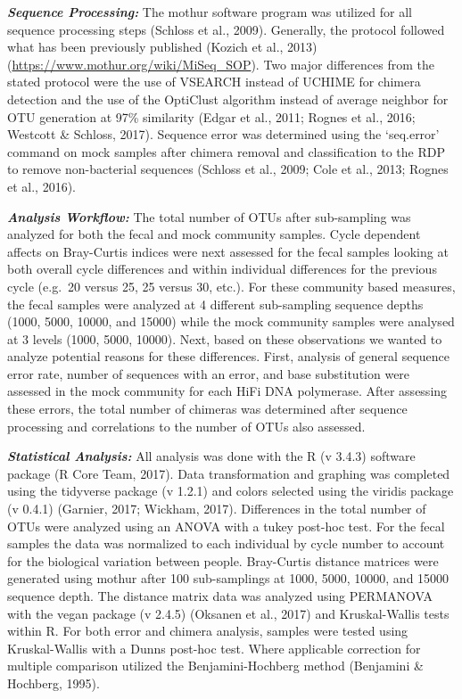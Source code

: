 \documentclass[12pt,]{article}
\begin{document}
\textbf{\emph{Sequence Processing:}} The mothur software program was
utilized for all sequence processing steps (Schloss et al., 2009).
Generally, the protocol followed what has been previously published
(Kozich et al., 2013) (\url{https://www.mothur.org/wiki/MiSeq_SOP}). Two
major differences from the stated protocol were the use of VSEARCH
instead of UCHIME for chimera detection and the use of the OptiClust
algorithm instead of average neighbor for OTU generation at 97\%
similarity (Edgar et al., 2011; Rognes et al., 2016; Westcott \&
Schloss, 2017). Sequence error was determined using the `seq.error'
command on mock samples after chimera removal and classification to the
RDP to remove non-bacterial sequences (Schloss et al., 2009; Cole et
al., 2013; Rognes et al., 2016).

\textbf{\emph{Analysis Workflow:}} The total number of OTUs after
sub-sampling was analyzed for both the fecal and mock community samples.
Cycle dependent affects on Bray-Curtis indices were next assessed for
the fecal samples looking at both overall cycle differences and within
individual differences for the previous cycle (e.g.~20 versus 25, 25
versus 30, etc.). For these community based measures, the fecal samples
were analyzed at 4 different sub-sampling sequence depths (1000, 5000,
10000, and 15000) while the mock community samples were analysed at 3
levels (1000, 5000, 10000). Next, based on these observations we wanted
to analyze potential reasons for these differences. First, analysis of
general sequence error rate, number of sequences with an error, and base
substitution were assessed in the mock community for each HiFi DNA
polymerase. After assessing these errors, the total number of chimeras
was determined after sequence processing and correlations to the number
of OTUs also assessed.

\textbf{\emph{Statistical Analysis:}} All analysis was done with the R
(v 3.4.3) software package (R Core Team, 2017). Data transformation and
graphing was completed using the tidyverse package (v 1.2.1) and colors
selected using the viridis package (v 0.4.1) (Garnier, 2017; Wickham,
2017). Differences in the total number of OTUs were analyzed using an
ANOVA with a tukey post-hoc test. For the fecal samples the data was
normalized to each individual by cycle number to account for the
biological variation between people. Bray-Curtis distance matrices were
generated using mothur after 100 sub-samplings at 1000, 5000, 10000, and
15000 sequence depth. The distance matrix data was analyzed using
PERMANOVA with the vegan package (v 2.4.5) (Oksanen et al., 2017) and
Kruskal-Wallis tests within R. For both error and chimera analysis,
samples were tested using Kruskal-Wallis with a Dunns post-hoc test.
Where applicable correction for multiple comparison utilized the
Benjamini-Hochberg method (Benjamini \& Hochberg, 1995).
\end{document}
